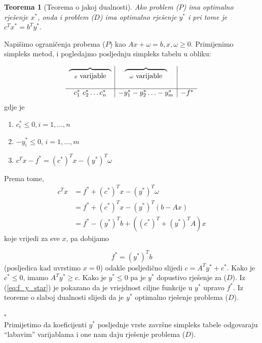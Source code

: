 \documentclass[a4paper, utf8, 11pt, colorlinks]{article}
\newtheorem{thm}{Teorema}
\newenvironment{proof}{{Dokaz:}}{\hfill$\square$}
\begin{document}
\begin{thm}[Teorema o jakoj dualnosti]
     Ako problem ($P$) ima optimalno rješenje $x^*$, onda i problem ($D$) ima optimalno rješenje $y^*$ i pri tome je $c^T x^* = b^T y^*$.
\end{thm}
\begin{proof}
         Napišimo ograničenja probema ($P$) kao $Ax + \omega = b, x, \omega \geq 0$.
         Primijenimo simpleks metod, i pogledajmo posljednju simpleks tabelu u obliku:
         
         $$\begin{array}{c |c | c}
         \overbrace{\ \ \ \ \ \hspace{1.5cm}}_{x \mbox{ varijable}}     &  \overbrace{\ \ \ \ \ \hspace{1.5cm}}_{\omega \mbox{ varijable}} &   \\
                                                           & &   \\
         \hline
             c_1^*\ c_2^* \ldots c_n^*            & -y_1^* -y_2^* \ldots -y_m^*  & -f^*
         \end{array}
         $$
   gdje je 
   \begin{enumerate}
       \item    $c^*_i \leq 0, i = 1,\ldots, n$ 
       \item    $-y_i^* \leq 0$, $i = 1,\ldots, m$
       \item  $c^T x - f^* = (c^*)^T x - (y^*)^T \omega$
    \end{enumerate}
    Prema tome, 
    \begin{align*}
           c^T x &=  f^* + (c^*)^T x - (y^*)^T \omega \\
                 &=  f^* + (c^*)^T x - (y^*)^T (b - Ax) \\
                 &= f^*  - (y^*)^T b +   ((c^*)^T + (y^*)^T A ) x
    \end{align*}
    koje vrijedi za sve $x$, pa dobijamo 
    
    \begin{equation}\label{eq:f_y_star}
        f^* = (y^*)^T b
    \end{equation}
     (posljedica kad uvrstimo $x = 0$) odakle posljedično slijedi 
    $ c = A^T y^* + c^*$. 
    Kako je $c^* \leq 0$, imamo  $A^T y^* \geq c$. Kako je $y^* \leq 0$ pa je $y^*$ dopustivo rješenje za  ($D$).  Iz (\ref{eq:f_y_star}) je pokazano da je vriejdnost ciljne funkcije u $y^*$ upravo $f^*$. Iz teoreme o slaboj dualnosti slijedi da je $y^*$ optimalno rješenje problema  ($D$). 
    
\end{proof} \\
Primijetimo da koeficijenti $y^*$ posljednje vrste završne simpleks tabele odgovaraju  ``labavim'' varijablama i one nam daju rješenje problema  ($D$).  
\end{document}

